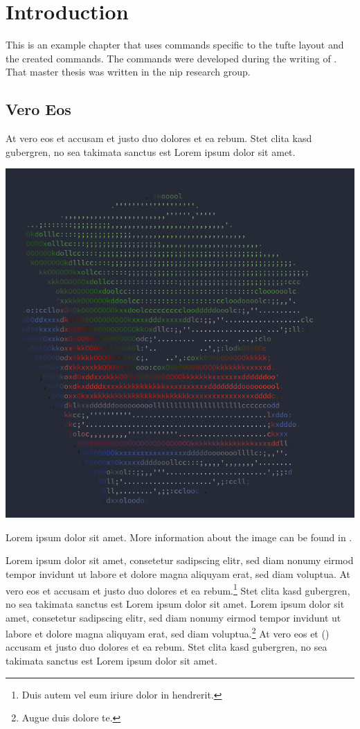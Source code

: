 \chapter{Introduction}
This is an example chapter that uses commands specific to the tufte layout and the created commands. The commands were developed during the writing of \cite{schmiegel2023}. That master thesis was written in the \ac{nip} research group.

\section{Vero Eos}
At vero eos et accusam et justo duo dolores et ea rebum. Stet clita kasd gubergren, no sea takimata sanctus est Lorem ipsum dolor sit amet. 

\begin{marginfigure}
    \includegraphics{figures/books.png}
    \caption{Lorem ipsum dolor sit amet. More information about the image can be found in \protect{}.}
    \label{fig:books}
\end{marginfigure}

Lorem ipsum dolor sit amet, consetetur sadipscing elitr, sed diam nonumy eirmod tempor invidunt ut labore et dolore magna aliquyam erat, sed diam voluptua. At vero eos et accusam et justo duo dolores et ea rebum.\footnote{Duis autem vel eum iriure dolor in hendrerit.} Stet clita kasd gubergren, no sea takimata sanctus est Lorem ipsum dolor sit amet. Lorem ipsum dolor sit amet, consetetur sadipscing elitr, sed diam nonumy eirmod tempor invidunt ut labore et dolore magna aliquyam erat, sed diam voluptua.\footnote{Augue duis dolore te.} At vero eos et () accusam et justo duo dolores et ea rebum. Stet clita kasd gubergren, no sea takimata sanctus est Lorem ipsum dolor sit amet.

